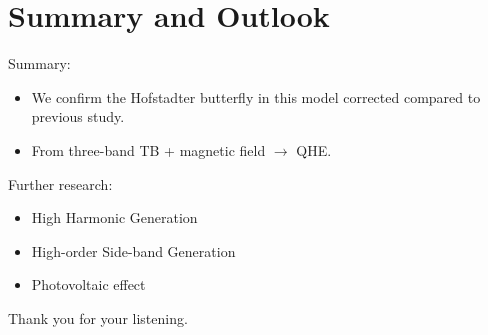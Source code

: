 \documentclass[aspectratio=169,compress,x11names]{beamer}
\begin{document}
	\section{Summary and Outlook}
	\begin{frame}
		\begin{block}{Summary:}
			\begin{itemize}
				\item We confirm the Hofstadter butterfly in this model corrected compared to previous study.\\
				\item From three-band TB + magnetic field $\to$ QHE.
			\end{itemize}
		\end{block}
		\begin{exampleblock}{Further research:}
			\begin{itemize}
				\item High Harmonic Generation
				\item High-order Side-band Generation
				\item Photovoltaic effect
			\end{itemize}
		\end{exampleblock}
		\begin{multicols}{2}
			\begin{center}
				\null\vfill
				Thank you for your listening.
				\null\vfill
			\end{center}\columnbreak
		\end{multicols}
	\end{frame}
\end{document}
